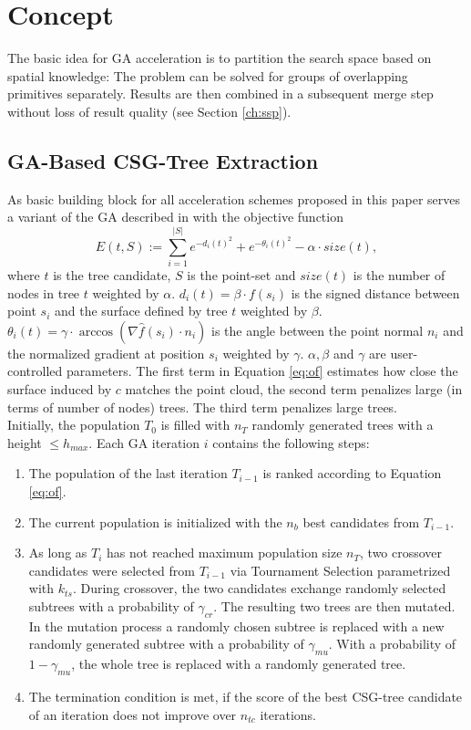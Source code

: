 \section{Concept}
The basic idea for \ac{GA} acceleration is to partition the search space based on spatial knowledge: 
The problem can be solved for groups of overlapping primitives separately. Results are then combined in a subsequent merge step without loss of result quality (see Section \ref{ch:ssp}).
\subsection{\ac{GA}-Based \ac{CSG}-Tree Extraction}
\label{ch:ga}
As basic building block for all acceleration schemes proposed in this paper serves a variant of the \ac{GA} described in \cite{fayolle2016evolutionary} with the objective function
\begin{equation}
\label{eq:of}
E(t, S) := \sum_{i=1}^{|S|}{e^{-d_i(t)^2}+e^{-\theta_i(t)^2}}-\alpha \cdot size(t),
\end{equation}
where $t$ is the tree candidate, $S$ is the point-set and $size(t)$ is the number of nodes in tree $t$ weighted by $\alpha$.
$d_i(t) = \beta \cdot f(s_i)$ is the signed distance between point $s_i$ and the surface defined by tree $t$ weighted by $\beta$.
$\theta_i(t) = \gamma \cdot  \arccos(\nabla \hat{f}(s_i) \cdot n_i)$ is the angle between the point normal $n_i$ and the normalized gradient at position $s_i$ weighted by $\gamma$.  
$\alpha, \beta$ and $\gamma$ are user-controlled parameters. 
The first term in Equation \ref{eq:of} estimates how close the surface induced by $c$ matches the point cloud, the second term penalizes large (in terms of number of nodes) trees.
The third term penalizes large trees.
\\
Initially, the population $T_0$ is filled with $n_T$ randomly generated trees with a height $\le h_{max}$. 
Each \ac{GA} iteration $i$ contains the following steps:
\begin{enumerate}
\item The population of the last iteration $T_{i-1}$ is ranked according to Equation \ref{eq:of}.
\item The current population is initialized with the $n_b$ best candidates from $T_{i-1}$.
\item As long as $T_i$ has not reached maximum population size $n_T$, two crossover candidates were selected from $T_{i-1}$ via Tournament Selection \cite{miller95genetic} parametrized with $k_{ts}$.
During crossover, the two candidates exchange randomly selected subtrees with a probability of $\gamma_{cr}$.
The resulting two trees are then mutated. 
In the mutation process a randomly chosen subtree is replaced with a new randomly generated subtree with a probability of $\gamma_{mu}$.
With a probability of $1-\gamma_{mu}$, the whole tree is replaced with a randomly generated tree.
\item The termination condition is met, if the score of the best \ac{CSG}-tree candidate of an iteration does not improve over $n_{tc}$ iterations.  	 
\end{enumerate}  
